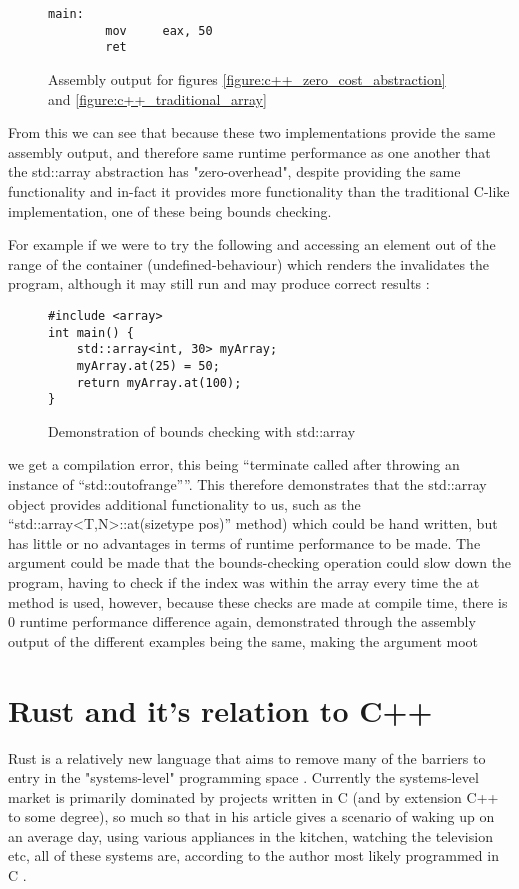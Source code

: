 \documentclass{article}
\begin{document}
\begin{figure}[H]
	\begin{lstlisting}[language={[x86masm]Assembler}]
main:
        mov     eax, 50
        ret
				\end{lstlisting}
	\caption{Assembly output for figures \ref{figure:c++_zero_cost_abstraction} and \ref{figure:c++_traditional_array}}
	\label{figure:code:assembly_c++_array}
\end{figure}

From this we can see that because these two implementations provide the same assembly output, and therefore same runtime performance as one another that the std::array abstraction has "zero-overhead", despite providing the same functionality and in-fact it provides more functionality than the traditional C-like implementation, one of these being bounds checking.

For example if we were to try the following and accessing an element out of the range of the container (undefined-behaviour) which renders the invalidates the program, although it may still run and may produce correct results \cite{cpp-reference-ub}:

\begin{figure}[H]
	\begin{lstlisting}
#include <array>
int main() {
    std::array<int, 30> myArray;
    myArray.at(25) = 50;
    return myArray.at(100);
}
 	\end{lstlisting}
	\caption{Demonstration of bounds checking with std::array}
\end{figure}

we get a compilation error, this being ``terminate called after throwing an instance of ``std::out\textunderscore of\textunderscore range''''. This therefore demonstrates that the std::array object provides additional functionality to us, such as the ``std::array\textless T,N\textgreater::at(size\textunderscore type pos)'' method) which could be hand written, but has little or no advantages in terms of runtime performance to be made.
The argument could be made that the bounds-checking operation could slow down the program, having to check if the index was within the array every time the at method is used, however, because these checks are made at compile time, there is 0 runtime performance difference again, demonstrated through the assembly output of the different examples being the same, making the argument moot

\section{Rust and it's relation to C++}
Rust is a relatively new language that aims to remove many of the barriers to entry in the	"systems-level" programming space \textcite{rust-book1}. Currently the systems-level market is primarily dominated by projects written in C (and by extension C++ to some degree), so much so that in his article  \citeauthor{c-language-blog} gives a scenario of waking up on an average day, using various appliances in the kitchen, watching the television etc, all of these systems are, according to the author most likely programmed in C \cite{c-language-blog}.
\end{document}
